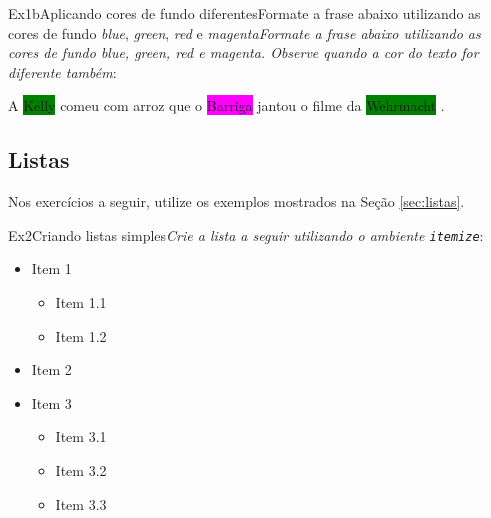 \begin{texercise}{Ex1b}{Aplicando cores de fundo diferentes}{Formate a frase abaixo utilizando as cores de fundo \textit{blue}, \textit{green}, \textit{red} e \textit{magenta}}\textit{Formate a frase abaixo utilizando as cores de fundo \textit{blue}, \textit{green}, \textit{red} e \textit{magenta}. Observe quando a cor do texto for diferente também}:\par\smallskip%
\begin{tcboutputlisting}
\begin{center}
    A \colorbox{blue}{\color{white}{famosa}} \colorbox{green}{Kelly}
    comeu \colorbox{red}{\color{white}{pão infetado}} com arroz que
    o \colorbox{magenta}{Barriga} jantou 
    \colorbox{blue}{\color{yellow}{vendo}}
    o filme da \colorbox{green}{Wehrmacht} 
    \colorbox{red}{\color{white}{xexelenta}}.
\end{center}
\end{tcboutputlisting}
\tcbuselistingtext%
\end{texercise}

\subsection*{Listas}
\label{sec:exec_listas}

Nos exercícios a seguir, utilize os exemplos mostrados na Seção \ref{sec:listas}.

\begin{texercise}{Ex2}{Criando listas simples}\textit{Crie a lista a seguir utilizando o ambiente \texttt{itemize}}:\par\smallskip%
\begin{tcboutputlisting}
\begin{itemize}
    \item Item 1
    \begin{itemize}
        \item Item 1.1
        \item Item 1.2
    \end{itemize}
    \item Item 2
    \item Item 3
    \begin{itemize}
        \item Item 3.1
        \item Item 3.2
        \item Item 3.3
    \end{itemize}
\end{itemize}
\end{tcboutputlisting}
\tcbuselistingtext%
\end{texercise}

